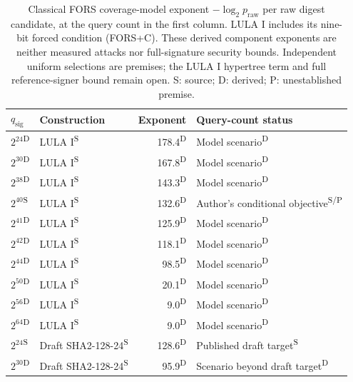 \begin{table}[!htbp]
\caption{Classical FORS coverage-model exponent $-\log_2 p_{\mathrm{raw}}$ per raw digest candidate, at the query count in the first column. LULA I includes its nine-bit forced condition (FORS+C). These derived component exponents are neither measured attacks nor full-signature security bounds. Independent uniform selections are premises; the LULA I hypertree term and full reference-signer bound remain open. S: source; D: derived; P: unestablished premise.}\label{tab:security-model}
\centering\small\setlength{\tabcolsep}{3pt}
\begin{tabular}{P{12mm}P{31mm}rP{43mm}}\toprule
$q_{\mathrm{sig}}$ & Construction & Exponent & Query-count status\\\midrule
$2^{24}$\textsuperscript{D} & LULA I\textsuperscript{S} &178.4\textsuperscript{D}&Model scenario\textsuperscript{D}\\
$2^{30}$\textsuperscript{D} & LULA I\textsuperscript{S} &167.8\textsuperscript{D}&Model scenario\textsuperscript{D}\\
$2^{38}$\textsuperscript{D} & LULA I\textsuperscript{S} &143.3\textsuperscript{D}&Model scenario\textsuperscript{D}\\
$2^{40}$\textsuperscript{S} & LULA I\textsuperscript{S} &132.6\textsuperscript{D}&Author's conditional objective\textsuperscript{S/P}\\
$2^{41}$\textsuperscript{D} & LULA I\textsuperscript{S} &125.9\textsuperscript{D}&Model scenario\textsuperscript{D}\\
$2^{42}$\textsuperscript{D} & LULA I\textsuperscript{S} &118.1\textsuperscript{D}&Model scenario\textsuperscript{D}\\
$2^{44}$\textsuperscript{D} & LULA I\textsuperscript{S} &98.5\textsuperscript{D}&Model scenario\textsuperscript{D}\\
$2^{50}$\textsuperscript{D} & LULA I\textsuperscript{S} &20.1\textsuperscript{D}&Model scenario\textsuperscript{D}\\
$2^{56}$\textsuperscript{D} & LULA I\textsuperscript{S} &9.0\textsuperscript{D}&Model scenario\textsuperscript{D}\\
$2^{64}$\textsuperscript{D} & LULA I\textsuperscript{S} &9.0\textsuperscript{D}&Model scenario\textsuperscript{D}\\\midrule
$2^{24}$\textsuperscript{S} & Draft SHA2-128-24\textsuperscript{S} &128.6\textsuperscript{D}&Published draft target\textsuperscript{S}\\
$2^{30}$\textsuperscript{D} & Draft SHA2-128-24\textsuperscript{S} &95.9\textsuperscript{D}&Scenario beyond draft target\textsuperscript{D}\\

\end{tabular}
\end{table}
